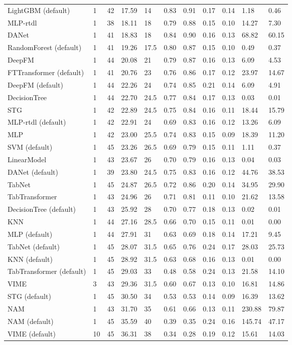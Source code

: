 \begin{tabular}{lllllllllll}
LightGBM (default) & 1 & 42 & 17.59 & 14 & 0.83 & 0.91 & 0.17 & 0.14 & 1.18 & 0.46 \\
MLP-rtdl & 1 & 38 & 18.11 & 18 & 0.79 & 0.88 & 0.15 & 0.10 & 14.27 & 7.30 \\
DANet & 1 & 41 & 18.83 & 18 & 0.84 & 0.90 & 0.16 & 0.13 & 68.82 & 60.15 \\
RandomForest (default) & 1 & 41 & 19.26 & 17.5 & 0.80 & 0.87 & 0.15 & 0.10 & 0.49 & 0.37 \\
DeepFM & 1 & 44 & 20.08 & 21 & 0.79 & 0.87 & 0.16 & 0.13 & 6.09 & 4.53 \\
FTTransformer (default) & 1 & 41 & 20.76 & 23 & 0.76 & 0.86 & 0.17 & 0.12 & 23.97 & 14.67 \\
DeepFM (default) & 1 & 44 & 22.26 & 24 & 0.74 & 0.85 & 0.21 & 0.14 & 6.09 & 4.91 \\
DecisionTree & 1 & 44 & 22.70 & 24.5 & 0.77 & 0.84 & 0.17 & 0.13 & 0.03 & 0.01 \\
STG & 1 & 42 & 22.89 & 24.5 & 0.75 & 0.84 & 0.16 & 0.11 & 18.44 & 15.79 \\
MLP-rtdl (default) & 1 & 42 & 22.91 & 24 & 0.69 & 0.83 & 0.16 & 0.12 & 13.26 & 6.09 \\
MLP & 1 & 42 & 23.00 & 25.5 & 0.74 & 0.83 & 0.15 & 0.09 & 18.39 & 11.20 \\
SVM (default) & 1 & 45 & 23.26 & 26.5 & 0.69 & 0.79 & 0.15 & 0.11 & 1.11 & 0.37 \\
LinearModel & 1 & 43 & 23.67 & 26 & 0.70 & 0.79 & 0.16 & 0.13 & 0.04 & 0.03 \\
DANet (default) & 1 & 39 & 23.80 & 24.5 & 0.75 & 0.83 & 0.16 & 0.12 & 44.76 & 38.53 \\
TabNet & 1 & 45 & 24.87 & 26.5 & 0.72 & 0.86 & 0.20 & 0.14 & 34.95 & 29.90 \\
TabTransformer & 1 & 43 & 24.96 & 26 & 0.71 & 0.81 & 0.11 & 0.10 & 21.62 & 13.58 \\
DecisionTree (default) & 1 & 43 & 25.92 & 28 & 0.70 & 0.77 & 0.18 & 0.13 & 0.02 & 0.01 \\
KNN & 1 & 44 & 27.16 & 28.5 & 0.66 & 0.70 & 0.15 & 0.11 & 0.01 & 0.00 \\
MLP (default) & 1 & 44 & 27.91 & 31 & 0.63 & 0.69 & 0.18 & 0.14 & 17.21 & 9.45 \\
TabNet (default) & 1 & 45 & 28.07 & 31.5 & 0.65 & 0.76 & 0.24 & 0.17 & 28.03 & 25.73 \\
KNN (default) & 1 & 45 & 28.92 & 31.5 & 0.63 & 0.68 & 0.16 & 0.13 & 0.01 & 0.00 \\
TabTransformer (default) & 1 & 45 & 29.03 & 33 & 0.48 & 0.58 & 0.24 & 0.13 & 21.58 & 14.10 \\
VIME & 3 & 43 & 29.36 & 31.5 & 0.60 & 0.67 & 0.13 & 0.10 & 16.81 & 14.86 \\
STG (default) & 1 & 45 & 30.50 & 34 & 0.53 & 0.53 & 0.14 & 0.09 & 16.39 & 13.62 \\
NAM & 1 & 43 & 31.70 & 35 & 0.61 & 0.66 & 0.13 & 0.11 & 230.88 & 79.87 \\
NAM (default) & 1 & 45 & 35.59 & 40 & 0.39 & 0.35 & 0.24 & 0.16 & 145.74 & 47.17 \\
VIME (default) & 10 & 45 & 36.31 & 38 & 0.34 & 0.28 & 0.19 & 0.12 & 15.61 & 14.03 \\
\bottomrule
\end{tabular}
